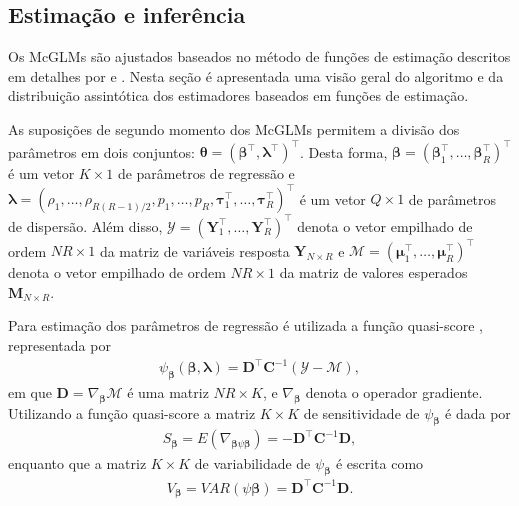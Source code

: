 \subsection{Estimação e inferência}

Os McGLMs são ajustados baseados no método de funções de estimação descritos em detalhes por \citet{Bonat16} e \citet{jorg04}. Nesta seção é apresentada uma visão geral do algoritmo e da distribuição assintótica dos estimadores baseados em funções de estimação.

As suposições de segundo momento dos McGLMs permitem a divisão dos
parâmetros em dois conjuntos: $\boldsymbol{\theta} = (\boldsymbol{\beta}^{\top}, \boldsymbol{\lambda}^{\top})^{\top}$. Desta forma, $\boldsymbol{\beta} = (\boldsymbol{\beta}_1^\top, \ldots, \boldsymbol{\beta}_R^\top)^\top$ é um vetor $K \times 1$ de parâmetros de regressão e $\boldsymbol{\lambda} = (\rho_1, \ldots, \rho_{R(R-1)/2}, p_1, \ldots, p_R, \boldsymbol{\tau}_1^\top, \ldots, \boldsymbol{\tau}_R^\top)^\top$ é um vetor $Q \times 1$ de parâmetros de dispersão. Além disso, $\mathcal{Y} = (\boldsymbol{Y}_1^\top, \ldots, \boldsymbol{Y}_R^\top)^\top$ denota o vetor empilhado de ordem $NR \times 1$ da matriz de variáveis resposta $\boldsymbol{Y}_{N \times R}$ e $\mathcal{M} = (\boldsymbol{\mu}_1^\top, \ldots, \boldsymbol{\mu}_R^\top)^\top$ denota o vetor empilhado de ordem $NR \times 1$ da matriz de valores esperados $\boldsymbol{M}_{N \times R}$.

Para estimação dos parâmetros de regressão é utilizada a função quasi-score \citep{Liang86}, representada por
\begin{equation}
\label{eq:qs}
      \begin{aligned}
        \psi_{\boldsymbol{\beta}}(\boldsymbol{\beta},
          \boldsymbol{\lambda}) = \boldsymbol{D}^\top
            \boldsymbol{C}^{-1}(\mathcal{Y} - \mathcal{M}),
\end{aligned}
\end{equation}
\noindent em que $\boldsymbol{D} = \nabla_{\boldsymbol{\beta}} \mathcal{M}$ 
é uma matriz $NR \times K$, e $\nabla_{\boldsymbol{\beta}}$ denota o 
operador gradiente. Utilizando a função quasi-score a matriz $K \times K$
de sensitividade de $\psi_{\boldsymbol{\beta}}$ é dada por
\begin{equation}
\begin{aligned}
S_{\boldsymbol{\beta}} = E(\nabla_{\boldsymbol{\beta} \psi \boldsymbol{\beta}}) = -\boldsymbol{D}^{\top} \boldsymbol{C}^{-1} \boldsymbol{D},
\end{aligned}
\end{equation}
\noindent enquanto que a matriz $K \times K$ de variabilidade de $\psi_{\boldsymbol{\beta}}$ é escrita como
\begin{equation}
\begin{aligned}
V_{\boldsymbol{\beta}} = VAR(\psi \boldsymbol{\beta}) = \boldsymbol{D}^{\top} \boldsymbol{C}^{-1} \boldsymbol{D}.
\end{aligned}
\end{equation}

